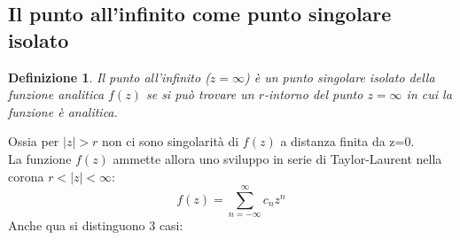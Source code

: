 \documentclass[twoside]{article}
\newtheorem{definition}{Definizione}[section]
\begin{document}
\subsection{Il punto all'infinito come punto singolare isolato}

\begin{definition}
Il punto all'infinito ($z=\infty$) è un punto singolare isolato della funzione analitica $f(z)$ se si può trovare un $r$-intorno del punto $z=\infty$ in cui la funzione è analitica.
\end{definition}
Ossia per $|z|>r$ non ci sono singolarità di $f(z)$ a distanza finita da z=0.
\\
La funzione $f(z)$ ammette allora uno sviluppo in serie di Taylor-Laurent nella corona $r<|z|<\infty$:
\begin{equation}
    f(z)=\sum_{n=-\infty}^{\infty}c_n z^n
\end{equation}
Anche qua si distinguono 3 casi:
\end{document}
